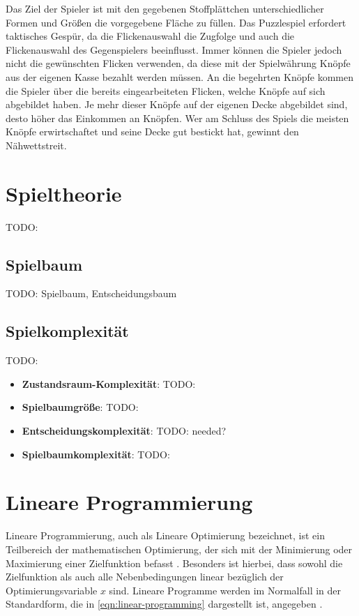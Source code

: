 Das Ziel der Spieler ist mit den gegebenen Stoffplättchen unterschiedlicher Formen und Größen die vorgegebene Fläche zu füllen. Das Puzzlespiel erfordert taktisches Gespür, da die Flickenauswahl die Zugfolge und auch die Flickenauswahl des Gegenspielers beeinflusst. Immer können die Spieler jedoch nicht die gewünschten Flicken verwenden, da diese mit der Spielwährung Knöpfe aus der eigenen Kasse bezahlt werden müssen. An die begehrten Knöpfe kommen die Spieler über die bereits eingearbeiteten Flicken, welche Knöpfe auf sich abgebildet haben. Je mehr dieser Knöpfe auf der eigenen Decke abgebildet sind, desto höher das Einkommen an Knöpfen. Wer am Schluss des Spiels die meisten Knöpfe erwirtschaftet und seine Decke gut bestickt hat, gewinnt den Nähwettstreit. \cite{SpielDesJahresPatchwork}

\section{Spieltheorie}
\label{chapter:spieltheorie}

TODO:

\subsection{Spielbaum}

TODO: Spielbaum, Entscheidungsbaum

\subsection{Spielkomplexität}

TODO:

\begin{itemize}
    \item \textbf{Zustandsraum-Komplexität}: TODO:
    \item \textbf{Spielbaumgröße}: TODO:
    \item \textbf{Entscheidungskomplexität}: TODO: needed?
    \item \textbf{Spielbaumkomplexität}: TODO:
\end{itemize}

\pagebreak

\section{Lineare Programmierung}
\label{chapter:lineare-programmierung}

Lineare Programmierung, auch als Lineare Optimierung bezeichnet, ist ein Teilbereich der mathematischen Optimierung, der sich mit der Minimierung oder Maximierung einer Zielfunktion befasst \cite{2024.MathWorksLP}. Besonders ist hierbei, dass sowohl die Zielfunktion als auch alle Nebenbedingungen linear bezüglich der Optimierungsvariable $x$ sind. Lineare Programme werden im Normalfall in der Standardform, die in \ref{eqn:linear-programming} dargestellt ist, angegeben \cite[S. 6]{2023.ConvexOptimization}.

